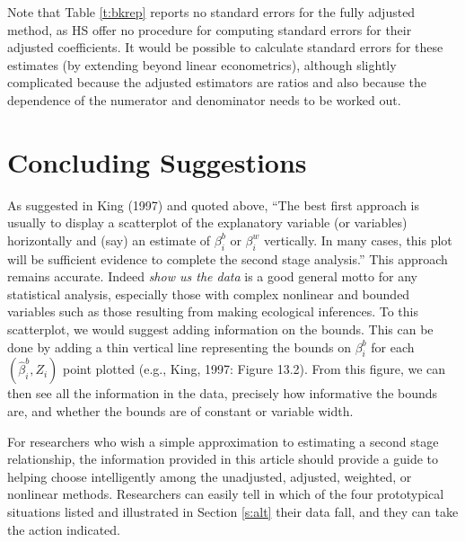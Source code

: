 \documentclass[11pt,titlepage]{article}
\begin{document}
Note that Table \ref{t:bkrep} reports no standard errors for the fully
adjusted method, as HS offer no procedure for computing standard
errors for their adjusted coefficients.  It would be possible to
calculate standard errors for these estimates (by extending beyond
linear econometrics), although slightly complicated because the
adjusted estimators are ratios and also because the dependence of the
numerator and denominator needs to be worked out.

\section{Concluding Suggestions}

As suggested in King (1997) and quoted above, ``The best first
approach is usually to display a scatterplot of the explanatory
variable (or variables) horizontally and (say) an estimate of
$\beta_i^b$ or $\beta_i^w$ vertically.  In many cases, this plot will
be sufficient evidence to complete the second stage analysis.''  This
approach remains accurate.  Indeed \emph{show us the data} is a good
general motto for any statistical analysis, especially those with
complex nonlinear and bounded variables such as those resulting from
making ecological inferences.  To this scatterplot, we would suggest
adding information on the bounds.  This can be done by adding a thin
vertical line representing the bounds on $\beta_i^b$ for each
$(\hat\beta_i^b,Z_i)$ point plotted (e.g., King, 1997: Figure 13.2).
From this figure, we can then see all the information in the data,
precisely how informative the bounds are, and whether the bounds are
of constant or variable width.

For researchers who wish a simple approximation to estimating a second
stage relationship, the information provided in this article should
provide a guide to helping choose intelligently among the unadjusted,
adjusted, weighted, or nonlinear methods.  Researchers can easily tell
in which of the four prototypical situations listed and illustrated in
Section \ref{s:alt} their data fall, and they can take the action
indicated.
\end{document}
